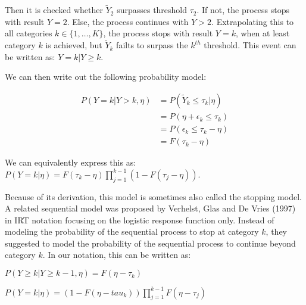 Then it is checked whether $\tilde Y_{2}$ surpasses threshold $\tau_{2}$. If not, the process stops with result $Y=2$. Else, the process continues with $Y>2$. Extrapolating this to all categories $k \in \{1, \ldots, K \}$, the process stops with result $Y=k$, when at least category $k$ is achieved, but $\tilde Y_{k}$ failts to surpass the $k^{th}$ threshold. This event can be written as: $Y = k|Y \geq k$.

We can then write out the following probability model:

\begin{align*}
P(Y = k | Y>k, \eta) &= P(\tilde Y_{k} \leq \tau_{k} | \eta) \\
&= P(\eta + \epsilon_{k} \leq \tau_{k}) \\
&= P(\epsilon_{k} \leq \tau_{k} - \eta) \\
&= F(\tau_{k} - \eta)
\end{align*}

We can equivalently express this as: $P(Y = k | \eta) = F(\tau_{k} - \eta) \prod_{j=1}^{k-1} (1-F(\tau_{j} - \eta))$.

Because of its derivation, this model is sometimes also called the stopping model. A related sequential model was proposed by Verhelst, Glas and De Vries (1997) in IRT notation focusing on the logistic response function only. Instead of modeling the probability of the sequential process to stop at category $k$, they suggested to model the probability of the sequential process to continue beyond category $k$. In our notation, this can be written as:

$P(Y \geq k | Y \geq k-1, \eta) = F(\eta - \tau_{k})$

$P(Y=k | \eta) = (1-F(\eta-tau_{k})) \prod_{j=1}^{k-1} F(\eta-\tau_{j})$
